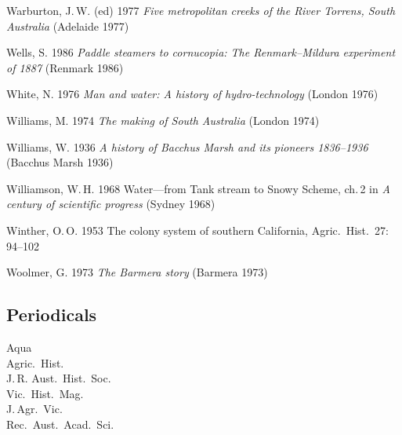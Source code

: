 Warburton, J.\,W. (ed) 1977 \textit{Five metropolitan creeks of the
River Torrens, South Australia} (Adelaide 1977)

Wells, S.  1986 \textit{Paddle steamers to cornucopia: The
Renmark--Mildura experiment of 1887} (Renmark 1986)

White, N. 1976 \textit{Man and water: A history of hydro-technology} (London
1976)

Williams, M. 1974 \textit{The making of South Australia} (London 1974)

Williams, W.  1936 \textit{A history of Bacchus Marsh and its pioneers
1836--1936} (Bacchus Marsh 1936)

Williamson, W.\,H. 1968 Water---from Tank stream to Snowy Scheme,
ch.\,2 in \textit{A century of scientific progress} (Sydney 1968)

Winther, O.\,O.  1953 The colony system of southern California,
Agric.\ Hist.\ 27: 94--102

Woolmer, G.  1973 \textit{The Barmera story} (Barmera 1973)

\subsection*{Periodicals}
Aqua\\
Agric.\ Hist.\\
J.\,R. Aust.\ Hist.\ Soc.\\
Vic.\ Hist.\ Mag.\\
J.\,Agr.\ Vic.\\
Rec.\ Aust.\ Acad.\ Sci.\\



